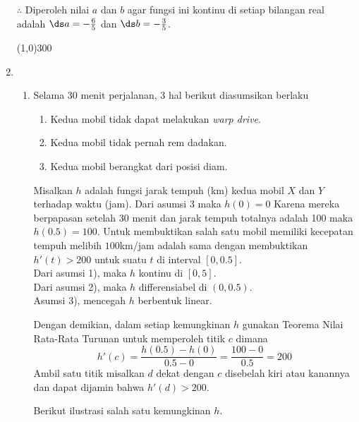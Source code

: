 \begin{enumerate}[leftmargin=*, label={\arabic*}.]
$\therefore$ Diperoleh nilai $a$ dan $b$ agar fungsi ini kontinu di setiap 
bilangan real adalah $\ds a = -\frac{6}{5}$ dan $\ds b=-\frac{3}{5}$.
\begin{center}
    \line(1,0){300}
\end{center}
\item 
\begin{enumerate}[label={\alph*}.]
    \item Selama 30 menit perjalanan, 3 hal berikut diasumsikan berlaku 
    \begin{enumerate}[label={\arabic*})]
        \item Kedua mobil tidak dapat melakukan \textit{warp drive}.
        \item Kedua mobil tidak pernah rem dadakan.
        \item Kedua mobil berangkat dari posisi diam.
    \end{enumerate}
    Misalkan $h$ adalah fungsi jarak tempuh (km) kedua mobil $X$
    dan $Y$ terhadap waktu (jam). Dari asumsi 3 maka $h(0)=0$ Karena mereka 
    berpapasan setelah 30 menit dan jarak tempuh totalnya adalah 100 maka 
    $h(0.5) = 100$. Untuk membuktikan salah satu mobil memiliki kecepatan 
    tempuh melibih $100$km/jam adalah sama dengan membuktikan $h'(t) > 200$ 
    untuk suatu $t$ di interval $[0,0.5]$.\\
    Dari asumsi 1), maka $h$ kontinu di $[0,5]$.\\
    Dari asumsi 2), maka $h$ differensiabel di $(0,0.5)$.\\
    Asumsi 3), mencegah $h$ berbentuk linear.

    Dengan demikian, dalam setiap kemungkinan $h$ gunakan Teorema Nilai 
    Rata-Rata Turunan untuk memperoleh titik $c$ dimana
    \[
    h'(c) = \frac{h(0.5)-h(0)}{0.5-0} = \frac{100-0}{0.5} = 200
    \]
    Ambil satu titik misalkan $d$ dekat dengan $c$ disebelah kiri atau kanannya 
    dan dapat dijamin bahwa $h'(d) > 200$.

    Berikut ilustrasi salah satu kemungkinan $h$.
    \begin{center}
\end{center}
\end{enumerate}
\end{enumerate}
